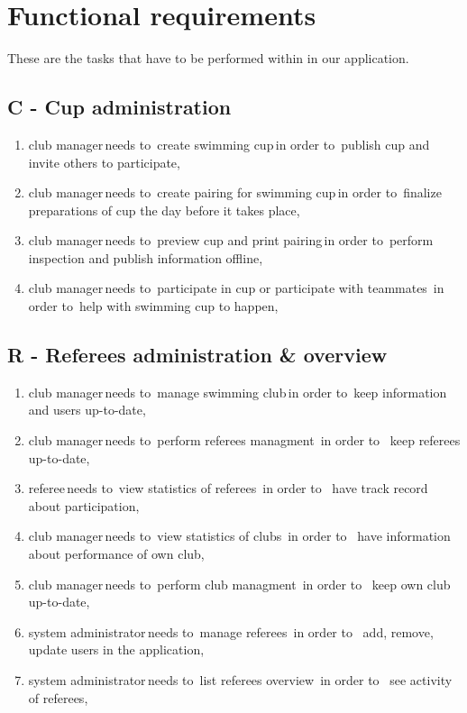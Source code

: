 \section{Functional requirements}
These are the tasks that have to be performed within in our application.
\subsection*{C - Cup administration}
\begin{enumerate}
    \item \lbrack club manager\rbrack \,needs to\, \lbrack create swimming cup\rbrack \,in order to\, \lbrack publish cup and invite others to participate\rbrack,
    \item \lbrack club manager\rbrack \,needs to\, \lbrack create pairing for swimming cup\rbrack \,in order to\, \lbrack finalize preparations of cup the day before it takes place\rbrack,
    \item \lbrack club manager\rbrack \,needs to\, \lbrack preview cup and print pairing\rbrack \,in order to\, \lbrack perform inspection and publish information offline\rbrack,
    \item \lbrack club manager\rbrack \,needs to\, \lbrack participate in cup or participate with teammates\rbrack \, in order to\, \lbrack help with swimming cup to happen\rbrack,
\end{enumerate} 
\subsection*{R - Referees administration \& overview}
\begin{enumerate}
\item \lbrack club manager\rbrack \,needs to\, \lbrack manage swimming club\rbrack \,in order to\, \lbrack keep information and users up-to-date\rbrack,
\item \lbrack club manager\rbrack \,needs to\, \lbrack perform referees managment\rbrack \, in order to \, \lbrack keep referees up-to-date\rbrack,
\item \lbrack referee\rbrack \,needs to\, \lbrack view statistics of referees\rbrack \, in order to \, \lbrack have track record about participation\rbrack,
\item \lbrack club manager\rbrack \,needs to\, \lbrack view statistics of clubs\rbrack \, in order to \, \lbrack have information about performance of own club\rbrack,
\item \lbrack club manager\rbrack \,needs to\, \lbrack perform club managment\rbrack \, in order to \, \lbrack keep own club up-to-date\rbrack,
\item \lbrack system administrator\rbrack \,needs to\, \lbrack manage referees\rbrack \, in order to \, \lbrack add, remove, update users in the application\rbrack,
\item \lbrack system administrator\rbrack \,needs to\, \lbrack list referees overview\rbrack \, in order to \, \lbrack see activity of referees\rbrack,
\end{enumerate} 
